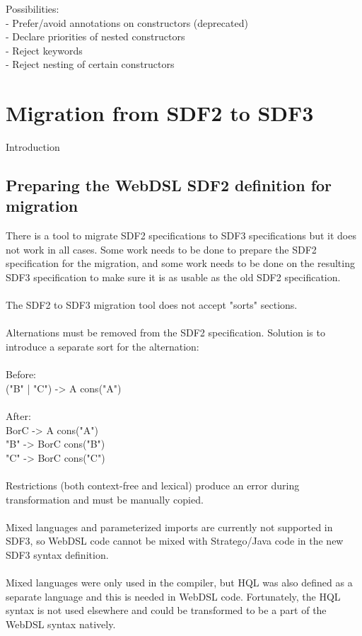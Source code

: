       Possibilities:
      \\- Prefer/avoid annotations on constructors (deprecated)
      \\- Declare priorities of nested constructors
      \\- Reject keywords
      \\- Reject nesting of certain constructors

  \section{Migration from SDF2 to SDF3}

    Introduction

    \subsection{Preparing the WebDSL SDF2 definition for migration}

      There is a tool to migrate SDF2 specifications to SDF3 specifications but it does not work in all cases. Some work needs to be done to prepare the SDF2 specification for the migration, and some work needs to be done on the resulting SDF3 specification to make sure it is as usable as the old SDF2 specification.
      \\\\The SDF2 to SDF3 migration tool does not accept "sorts" sections.
      \\\\Alternations must be removed from the SDF2 specification. Solution is to introduce a separate sort for the alternation:
      \\\\Before:
      \\("B" | "C") -> A {cons("A")}
      \\\\After:
      \\BorC -> A    {cons("A")}
      \\"B"  -> BorC {cons("B")}
      \\"C"  -> BorC {cons("C")}
      \\\\Restrictions (both context-free and lexical) produce an error during transformation and must be manually copied.
      \\\\Mixed languages and parameterized imports are currently not supported in SDF3, so WebDSL code cannot be mixed with Stratego/Java code in the new SDF3 syntax definition.
      \\\\Mixed languages were only used in the compiler, but HQL was also defined as a separate language and this is needed in WebDSL code. Fortunately, the HQL syntax is not used elsewhere and could be transformed to be a part of the WebDSL syntax natively.

